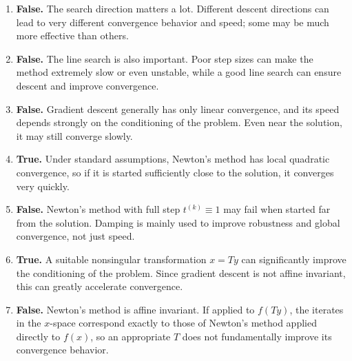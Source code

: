 \documentclass[11pt,letter,notitlepage]{article}
\theoremstyle{definition}
\begin{document}
\begin{solution}
\leavevmode\vspace{-2em}
\begin{enumerate}[label=(\alph*)]
    \item \textbf{False.} The search direction matters a lot. Different descent directions can lead to very different convergence behavior and speed; some may be much more effective than others.

    \item \textbf{False.} The line search is also important. Poor step sizes can make the method extremely slow or even unstable, while a good line search can ensure descent and improve convergence.

    \item \textbf{False.} Gradient descent generally has only linear convergence, and its speed depends strongly on the conditioning of the problem. Even near the solution, it may still converge slowly.

    \item \textbf{True.} Under standard assumptions, Newton's method has local quadratic convergence, so if it is started sufficiently close to the solution, it converges very quickly.

    \item \textbf{False.} Newton's method with full step $t^{(k)}\equiv 1$ may fail when started far from the solution. Damping is mainly used to improve robustness and global convergence, not just speed.

    \item \textbf{True.} A suitable nonsingular transformation $x=Ty$ can significantly improve the conditioning of the problem. Since gradient descent is not affine invariant, this can greatly accelerate convergence.

    \item \textbf{False.} Newton's method is affine invariant. If applied to $f(Ty)$, the iterates in the $x$-space correspond exactly to those of Newton's method applied directly to $f(x)$, so an appropriate $T$ does not fundamentally improve its convergence behavior.
\end{enumerate}
\end{solution}

\newpage
\end{document}
